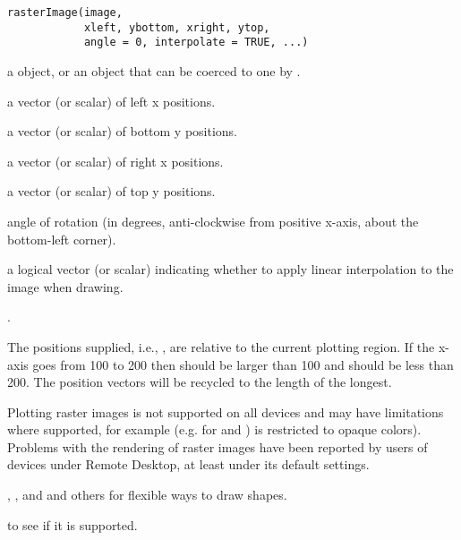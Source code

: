 %
\begin{Usage}
\begin{verbatim}
rasterImage(image,
            xleft, ybottom, xright, ytop,
            angle = 0, interpolate = TRUE, ...)
\end{verbatim}
\end{Usage}
%
\begin{Arguments}
\begin{ldescription}
\item[\code{image}] a  object, or an object that can be
coerced to one by .
\item[\code{xleft}] a vector (or scalar) of left x positions.
\item[\code{ybottom}] a vector (or scalar) of bottom y positions.
\item[\code{xright}] a vector (or scalar) of right x positions.
\item[\code{ytop}] a vector (or scalar) of top y positions.
\item[\code{angle}] angle of rotation (in degrees, anti-clockwise
from positive x-axis, about the bottom-left corner).
\item[\code{interpolate}] a logical vector (or scalar) indicating
whether to apply linear interpolation to the image when drawing. 
\item[\code{...}] .
\end{ldescription}
\end{Arguments}
%
\begin{Details}\relax
The positions supplied, i.e., ,
are relative to the current plotting region.  If the x-axis goes from
100 to 200 then  should be larger than 100 and 
should be less than 200.  The position vectors will be recycled to the
length of the longest.

Plotting raster images is not supported on all devices and may have
limitations where supported, for example (e.g. for 
and ) is restricted to opaque colors).
Problems with the rendering of raster images have been reported by
users of  devices under Remote Desktop, at least under
its default settings.
\end{Details}
%
\begin{SeeAlso}\relax
{},
, and  and others
for flexible ways to draw shapes.

 to see if it is supported.
\end{SeeAlso}
